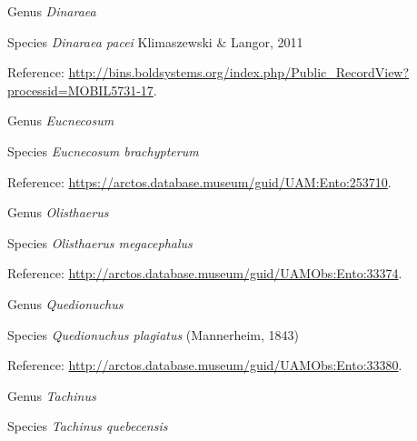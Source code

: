 \documentclass[9pt, article]{memoir}
\begin{document}
\begin{multicols}{2}
\vspace{6pt}\noindent\hspace{30pt}Genus \textit{Dinaraea}


\vspace{6pt}\noindent\hspace{36pt}Species \textit{Dinaraea pacei} Klimaszewski \& Langor, 2011


\vspace{6pt}Reference: 
\url{http://bins.boldsystems.org/index.php/Public_RecordView?processid=MOBIL5731-17}.

\vspace{6pt}\noindent\hspace{30pt}Genus \textit{Eucnecosum}


\vspace{6pt}\noindent\hspace{36pt}Species \textit{Eucnecosum brachypterum}


\vspace{6pt}Reference: 
\url{https://arctos.database.museum/guid/UAM:Ento:253710}.

\vspace{6pt}\noindent\hspace{30pt}Genus \textit{Olisthaerus}


\vspace{6pt}\noindent\hspace{36pt}Species \textit{Olisthaerus megacephalus}


\vspace{6pt}Reference: 
\url{http://arctos.database.museum/guid/UAMObs:Ento:33374}.

\vspace{6pt}\noindent\hspace{30pt}Genus \textit{Quedionuchus}


\vspace{6pt}\noindent\hspace{36pt}Species \textit{Quedionuchus plagiatus} (Mannerheim, 1843)


\vspace{6pt}Reference: 
\url{http://arctos.database.museum/guid/UAMObs:Ento:33380}.

\vspace{6pt}\noindent\hspace{30pt}Genus \textit{Tachinus}


\vspace{6pt}\noindent\hspace{36pt}Species \textit{Tachinus quebecensis}



\end{multicols}
\end{document}
